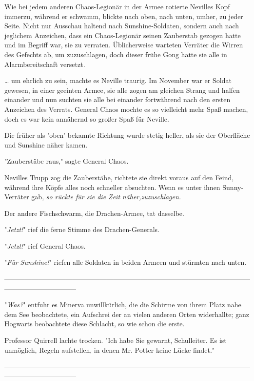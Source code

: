 {Wie bei jedem anderen Chaos-Legionär in der Armee rotierte Nevilles Kopf immerzu, während er schwamm, blickte nach oben, nach unten, umher, zu jeder Seite. Nicht nur Ausschau haltend nach Sunshine-Soldaten, sondern auch nach jeglichem Anzeichen, dass ein Chaos-Legionär seinen Zauberstab gezogen hatte und im Begriff war, sie zu verraten. Üblicherweise warteten Verräter die Wirren des Gefechts ab, um zuzuschlagen, doch dieser frühe Gong hatte sie alle in Alarmbereitschaft versetzt.

… um ehrlich zu sein, machte es Neville traurig. Im November war er Soldat gewesen, in einer geeinten Armee, sie alle zogen am gleichen Strang und halfen einander und nun suchten sie alle bei einander fortwährend nach den ersten Anzeichen des Verrats. General Chaos mochte es so vielleicht mehr Spaß machen, doch es war kein annähernd so großer Spaß für Neville.

Die früher als 'oben' bekannte Richtung wurde stetig heller, als sie der Oberfläche und Sunshine näher kamen.

"Zauberstäbe raus," sagte General Chaos.

Nevilles Trupp zog die Zauberstäbe, richtete sie direkt voraus auf den Feind, während ihre Köpfe alles noch schneller absuchten. Wenn es unter ihnen Sunny-Verräter gab, \emph{so rückte für sie die Zeit} \emph{näher,zuzuschlagen.}

Der andere Fischschwarm, die Drachen-Armee, tat dasselbe.

"\emph{Jetzt!}" rief die ferne Stimme des Drachen-Generals.

"\emph{Jetzt!}" rief General Chaos.

"\emph{Für Sunshine!}" riefen alle Soldaten in beiden Armeen und stürmten nach unten.

--------------------------------------------------------------------------------------------------------------------------------------------

"\emph{Was?}" entfuhr es Minerva unwillkürlich, die die Schirme von ihrem Platz nahe dem See beobachtete, ein Aufschrei der an vielen anderen Orten widerhallte; ganz Hogwarts beobachtete diese Schlacht, so wie schon die erste.

Professor Quirrell lachte trocken. "Ich habe Sie gewarnt, Schulleiter. Es ist unmöglich, Regeln aufstellen, in denen Mr. Potter keine Lücke findet."

--------------------------------------------------------------------------------------------------------------------------------------------

}
